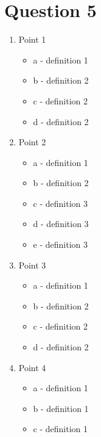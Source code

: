 \documentclass[12pt]{article}
\begin{document}
\section{Question 5}
\begin{enumerate}
    \item Point 1
    \begin{itemize}
        \item a - definition 1
        \item b - definition 2
        \item c - definition 2
        \item d - definition 2
    \end{itemize}
    \item Point 2
    \begin{itemize}
        \item a - definition 1
        \item b - definition 2
        \item c - definition 3
        \item d - definition 3
        \item e - definition 3
    \end{itemize}
    \item Point 3
    \begin{itemize}
        \item a - definition 1
        \item b - definition 2
        \item c - definition 2
        \item d - definition 2
    \end{itemize}
    \item Point 4
    \begin{itemize}
        \item a - definition 1
        \item b - definition 1
        \item c - definition 1
    \end{itemize}
\end{enumerate}
\end{document}
